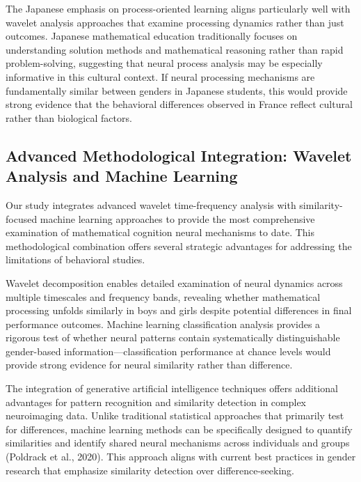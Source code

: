\documentclass[12pt, a4paper]{article}
\begin{document}
The Japanese emphasis on process-oriented learning aligns particularly well with wavelet analysis approaches that examine processing dynamics rather than just outcomes. Japanese mathematical education traditionally focuses on understanding solution methods and mathematical reasoning rather than rapid problem-solving, suggesting that neural process analysis may be especially informative in this cultural context. If neural processing mechanisms are fundamentally similar between genders in Japanese students, this would provide strong evidence that the behavioral differences observed in France reflect cultural rather than biological factors.


\subsection{Advanced Methodological Integration: Wavelet Analysis and Machine Learning}
Our study integrates advanced wavelet time-frequency analysis with similarity-focused machine learning approaches to provide the most comprehensive examination of mathematical cognition neural mechanisms to date. This methodological combination offers several strategic advantages for addressing the limitations of behavioral studies.

Wavelet decomposition enables detailed examination of neural dynamics across multiple timescales and frequency bands, revealing whether mathematical processing unfolds similarly in boys and girls despite potential differences in final performance outcomes. Machine learning classification analysis provides a rigorous test of whether neural patterns contain systematically distinguishable gender-based information—classification performance at chance levels would provide strong evidence for neural similarity rather than difference.

The integration of generative artificial intelligence techniques offers additional advantages for pattern recognition and similarity detection in complex neuroimaging data. Unlike traditional statistical approaches that primarily test for differences, machine learning methods can be specifically designed to quantify similarities and identify shared neural mechanisms across individuals and groups (Poldrack et al., 2020). This approach aligns with current best practices in gender research that emphasize similarity detection over difference-seeking.
\end{document}
